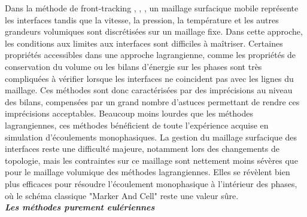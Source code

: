 Dans la m\'ethode de front-tracking \cite{Unverdi1992}, \cite{Shin2002}, \cite{Duquennoy2000}, un maillage surfacique mobile repr\'esente les interfaces tandis que la vitesse, la pression, la temp\'erature et les autres grandeurs volumiques sont discr\'etis\'ees sur un maillage fixe. Dans cette approche, les conditions aux limites aux interfaces sont difficiles \`a ma\^itriser.
Certaines propri\'et\'es accessibles dans une approche lagrangienne, comme les propri\'et\'es de conservation du volume ou les bilans d'\'energie sur les phases sont tr\`es compliqu\'ees à v\'erifier lorsque les interfaces ne
coincident pas avec les lignes du maillage. Ces m\'ethodes sont donc caract\'eris\'ees par des impr\'ecisions au niveau des bilans, compens\'ees par un grand nombre d'astuces permettant de rendre ces impr\'ecisions acceptables.
Beaucoup moins lourdes que les m\'ethodes lagrangiennes, ces m\'ethodes b\'en\'eficient de toute l'exp\'erience acquise en simulation d'\'ecoulements monophasiques. La gestion du maillage surfacique des interfaces reste une
difficult\'e majeure, notamment lors des changements de topologie, mais les contraintes sur ce maillage sont nettement moins s\'ev\`eres que pour le maillage volumique des m\'ethodes lagrangiennes. Elles se r\'ev\`elent bien plus
efficaces pour r\'esoudre l'\'ecoulement monophasique \`a l'int\'erieur des phases, o\`u le sch\'ema classique "Marker And Cell" reste une valeur s\^ure.\smallskip \\

\textit{\textbf{Les m\'ethodes purement eul\'eriennes}}\smallskip \\

